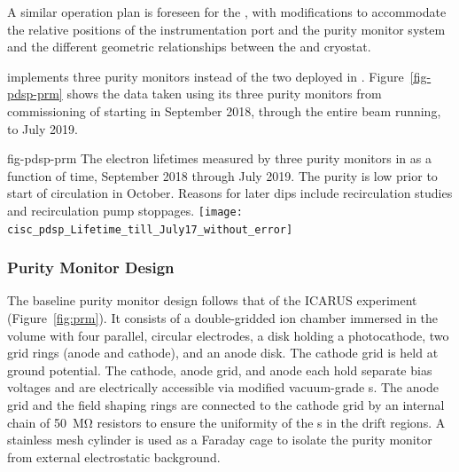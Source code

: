   A similar 
  operation plan is foreseen for %
  the , with modifications to accommodate the relative positions of the instrumentation port %
  and the purity monitor system and the %
  different geometric relationships between the  and cryostat.






 implements three purity monitors instead of the two deployed in .
Figure~\ref{fig-pdsp-prm} shows the  data taken using %
its three purity monitors from commissioning of  starting in September 2018, through the entire beam running, to July 2019.

\begin{dunefigure}{fig-pdsp-prm}
  {The electron lifetimes measured by three purity monitors in  as a function of time, September 2018 through July 2019. The purity is low prior to start of circulation in October. Reasons for later dips include recirculation studies and recirculation pump stoppages.}
  \texttt{[image: cisc\_pdsp\_Lifetime\_till\_July17\_without\_error]}
\end{dunefigure}

\subsubsection{Purity Monitor Design}

The  baseline purity monitor design follows that of  the ICARUS experiment (Figure~\ref{fig:prm})\cite{Adamowski:2014daa}.  It consists of a double-gridded ion chamber immersed in the \lar volume with four parallel, circular electrodes, a disk holding a photocathode, two grid rings (anode and cathode), and an anode disk. The cathode grid is held at ground potential. The cathode, anode grid, and anode 
each hold separate bias voltages and are electrically accessible via modified vacuum-grade  \fdth{}s. %
The anode grid and the field shaping rings are connected to the cathode grid by an internal chain of \SI{50}{\mega\ohm} resistors to ensure the uniformity of the \efield{}s in the drift regions. A stainless mesh cylinder is used as a Faraday cage to isolate the purity monitor from external electrostatic background. 

